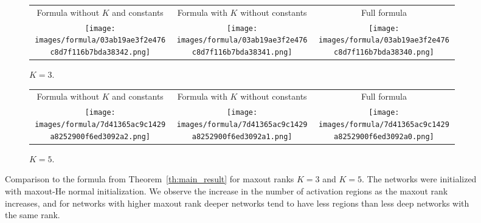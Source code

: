 \documentclass{article}
\theoremstyle{definition}
\begin{document}
\begin{figure}
    \begin{subfigure}{\textwidth}
        \setlength\tabcolsep{2pt}
        \begin{tabular}{ccc}
            \centering
            \small{Formula without $K$ and constants} &
            \small{Formula with $K$ without constants} &
            \small{Full formula} \\
            
            \texttt{[image: images/formula/03ab19ae3f2e476c8d7f116b7bda38342.png]} &
            \texttt{[image: images/formula/03ab19ae3f2e476c8d7f116b7bda38341.png]} &\texttt{[image: images/formula/03ab19ae3f2e476c8d7f116b7bda38340.png]}
        \end{tabular}
        \caption{\small $K = 3$.}
    \end{subfigure}
    \vspace{.2cm}
    
    \begin{subfigure}{\textwidth}
        \setlength\tabcolsep{2pt}
        \begin{tabular}{ccc}
            \centering
            \small{Formula without $K$ and constants} &
            \small{Formula with $K$ without constants} &
            \small{Full formula} \\
            \texttt{[image: images/formula/7d41365ac9c1429a8252900f6ed3092a2.png]} &
            \texttt{[image: images/formula/7d41365ac9c1429a8252900f6ed3092a1.png]} &
            \texttt{[image: images/formula/7d41365ac9c1429a8252900f6ed3092a0.png]}
        \end{tabular}
        \caption{\small $K = 5$.}
    \end{subfigure}
    
    \caption{Comparison to the formula from Theorem~\ref{th:main_result} for maxout ranks $K = 3$ and $K = 5$. The networks were initialized with maxout-He normal initialization.
    We observe the increase in the number of activation regions as the maxout rank increases, and for networks with higher maxout rank deeper networks tend to have less regions than less deep networks with the same rank.}
    \label{fig:formula_different_K} 
\end{figure}
\end{document}
